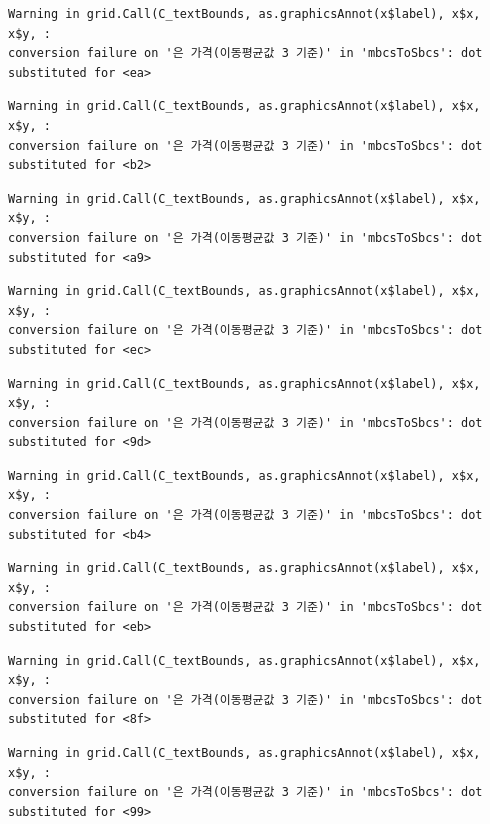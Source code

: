 \documentclass[
  letterpaper,
  DIV=11,
  numbers=noendperiod]{scrreprt}
\begin{document}
\begin{verbatim}
Warning in grid.Call(C_textBounds, as.graphicsAnnot(x$label), x$x, x$y, :
conversion failure on '은 가격(이동평균값 3 기준)' in 'mbcsToSbcs': dot
substituted for <ea>
\end{verbatim}

\begin{verbatim}
Warning in grid.Call(C_textBounds, as.graphicsAnnot(x$label), x$x, x$y, :
conversion failure on '은 가격(이동평균값 3 기준)' in 'mbcsToSbcs': dot
substituted for <b2>
\end{verbatim}

\begin{verbatim}
Warning in grid.Call(C_textBounds, as.graphicsAnnot(x$label), x$x, x$y, :
conversion failure on '은 가격(이동평균값 3 기준)' in 'mbcsToSbcs': dot
substituted for <a9>
\end{verbatim}

\begin{verbatim}
Warning in grid.Call(C_textBounds, as.graphicsAnnot(x$label), x$x, x$y, :
conversion failure on '은 가격(이동평균값 3 기준)' in 'mbcsToSbcs': dot
substituted for <ec>
\end{verbatim}

\begin{verbatim}
Warning in grid.Call(C_textBounds, as.graphicsAnnot(x$label), x$x, x$y, :
conversion failure on '은 가격(이동평균값 3 기준)' in 'mbcsToSbcs': dot
substituted for <9d>
\end{verbatim}

\begin{verbatim}
Warning in grid.Call(C_textBounds, as.graphicsAnnot(x$label), x$x, x$y, :
conversion failure on '은 가격(이동평균값 3 기준)' in 'mbcsToSbcs': dot
substituted for <b4>
\end{verbatim}

\begin{verbatim}
Warning in grid.Call(C_textBounds, as.graphicsAnnot(x$label), x$x, x$y, :
conversion failure on '은 가격(이동평균값 3 기준)' in 'mbcsToSbcs': dot
substituted for <eb>
\end{verbatim}

\begin{verbatim}
Warning in grid.Call(C_textBounds, as.graphicsAnnot(x$label), x$x, x$y, :
conversion failure on '은 가격(이동평균값 3 기준)' in 'mbcsToSbcs': dot
substituted for <8f>
\end{verbatim}

\begin{verbatim}
Warning in grid.Call(C_textBounds, as.graphicsAnnot(x$label), x$x, x$y, :
conversion failure on '은 가격(이동평균값 3 기준)' in 'mbcsToSbcs': dot
substituted for <99>
\end{verbatim}
\end{document}
